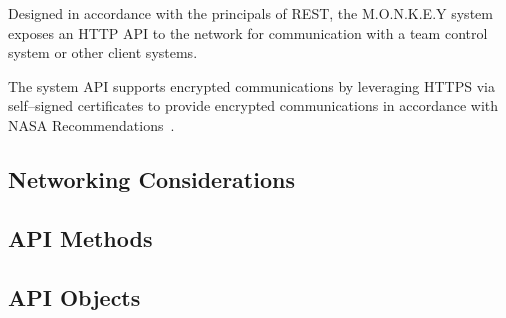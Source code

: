 Designed in accordance with the principals of REST, the M.O.N.K.E.Y system exposes an HTTP API to
the network for communication with a team control system or other client systems.

The system API supports encrypted communications by leveraging HTTPS via self--signed certificates
to provide encrypted communications in accordance with NASA
Recommendations~\cite[p.~30]{nasa-comp-2021}.

\subsection{Networking Considerations}\label{subsec:networking-considerations}

\subsection{API Methods}\label{subsec:api-methods}

\subsection{API Objects}\label{subsec:api-objects}